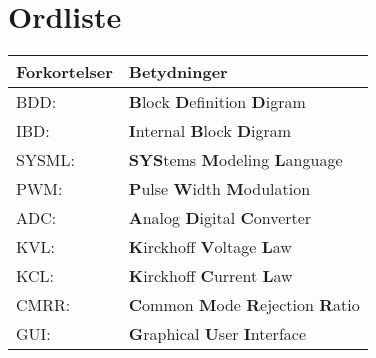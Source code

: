 \section*{Ordliste}
\begin{center}
		\begin{longtable}{ | m{6.5cm} | m{6.5cm}| } 
			\hline
			\textbf{Forkortelser} &\textbf{Betydninger} \\ 
			\hline
			BDD: & \textbf{B}lock \textbf{D}efinition \textbf{D}igram \\
			\hline
			IBD: & \textbf{I}nternal \textbf{B}lock \textbf{D}igram \\  
			\hline
			SYSML: & \textbf{SYS}tems \textbf{M}odeling \textbf{L}anguage \\ 
			\hline
			PWM: & \textbf{P}ulse \textbf{W}idth \textbf{M}odulation \\ 
			\hline	
				
				ADC: & \textbf{A}nalog \textbf{D}igital \textbf{C}onverter  \\ 
				
			\hline
			KVL: & \textbf{K}irckhoff \textbf{V}oltage \textbf{L}aw \\ 
			
			\hline
			KCL: & \textbf{K}irckhoff \textbf{C}urrent \textbf{L}aw \\ 
			
			\hline
			CMRR: & \textbf{C}ommon \textbf{M}ode \textbf{R}ejection \textbf{R}atio \\ 
			
			\hline
			GUI: & \textbf{G}raphical \textbf{U}ser \textbf{I}nterface \\ 
			
			\hline
		\end{longtable}
\end{center}
